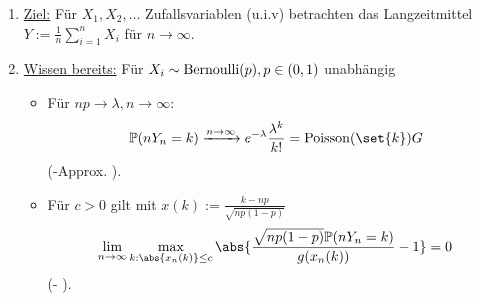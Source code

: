 ﻿%
\begin{enumerate}[label=]
	\item \ul{Ziel:} Für $X_1, X_2, \dots$ Zufallsvariablen (u.i.v) betrachten das Langzeitmittel $Y:= \frac{1}{n} \sum_{i=1}^n X_i$ für $n \to \infty$.
	\item  \ul{Wissen bereits:} Für $X_i \sim \operatorname{Bernoulli}(p), p \in (0,1)$ unabhängig
	\begin{itemize}
		\item Für $np \to \lambda, n \to \infty$:
		\begin{align*}
			\P(n Y_n = k) \xrightarrow{n \to \infty} e^{-\lambda}\frac{\lambda^k}{k!} = \Pois(\set{k}) 
G		\end{align*}
		(-Approx. ).
		\item Für $c > 0$ gilt mit $x(k) := \frac{k-np}{\sqrt{np(1-p)}}$
		\begin{align*}
			\lim_{n\to \infty} \max_{k: \abs{x_n(k)} \le c} \abs{\frac{\sqrt{np(1-p)}\P(nY_n = k)}{g(x_n(k))} -1} = 0
		\end{align*}
		(- ).
	\end{itemize}
\end{enumerate}
